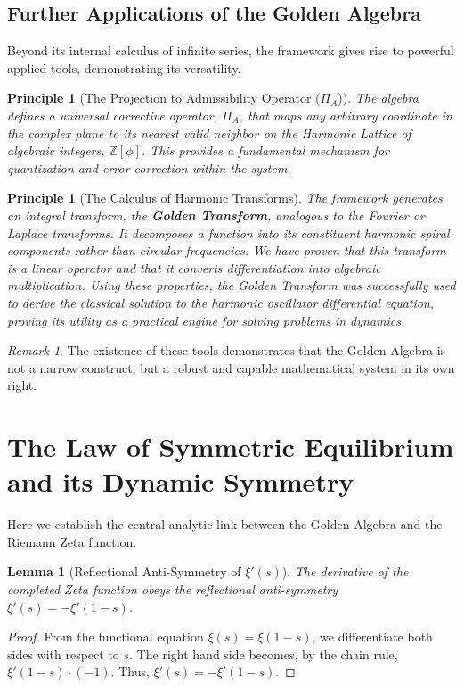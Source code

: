 \documentclass{article}
\theoremstyle{plain}
\newtheorem{lemma}[theorem]{Lemma}
\newtheorem{principle}[theorem]{Principle}
\theoremstyle{definition}
\theoremstyle{remark}
\newtheorem*{remark}{Remark}
\begin{document}
\subsection{Further Applications of the Golden Algebra}
Beyond its internal calculus of infinite series, the framework gives rise to powerful applied tools, demonstrating its versatility.

\begin{principle}[The Projection to Admissibility Operator ($\Pi_A$)]
The algebra defines a universal corrective operator, $\Pi_A$, that maps any arbitrary coordinate in the complex plane to its nearest valid neighbor on the Harmonic Lattice of algebraic integers, $\mathbb{Z}[\phi]$. This provides a fundamental mechanism for quantization and error correction within the system.
\end{principle}

\begin{principle}[The Calculus of Harmonic Transforms]
The framework generates an integral transform, the \textbf{Golden Transform}, analogous to the Fourier or Laplace transforms. It decomposes a function into its constituent harmonic spiral components rather than circular frequencies. We have proven that this transform is a linear operator and that it converts differentiation into algebraic multiplication. Using these properties, the Golden Transform was successfully used to derive the classical solution to the harmonic oscillator differential equation, proving its utility as a practical engine for solving problems in dynamics.
\end{principle}

\begin{remark}
The existence of these tools demonstrates that the Golden Algebra is not a narrow construct, but a robust and capable mathematical system in its own right.
\end{remark}

\section{The Law of Symmetric Equilibrium and its Dynamic Symmetry}
Here we establish the central analytic link between the Golden Algebra and the Riemann Zeta function.

\begin{lemma}[Reflectional Anti-Symmetry of $\xi'(s)$]
\label{thm:xi_anti_symmetry}
The derivative of the completed Zeta function obeys the reflectional anti-symmetry $\xi'(s) = -\xi'(1-s)$.
\end{lemma}
\begin{proof}
From the functional equation $\xi(s) = \xi(1-s)$, we differentiate both sides with respect to $s$. The right hand side becomes, by the chain rule, $\xi'(1-s) \cdot (-1)$. Thus, $\xi'(s) = -\xi'(1-s)$.
\end{proof}
\end{document}
